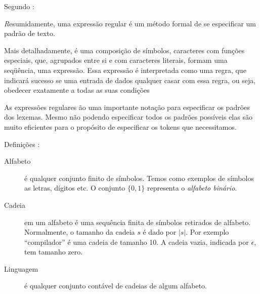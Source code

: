 Segundo :
\begin{citacao}{4cm}{0cm} \footnotesize \emph
	Resumidamente, uma expressão regular é um método formal de se especificar um padrão de texto.

	Mais detalhadamente, é uma composição de símbolos, caracteres com funções
	especiais, que, agrupados entre si e com caracteres literais, formam uma
	seqüência, uma expressão. Essa expressão é interpretada como uma regra, que
	indicará sucesso se uma entrada de dados qualquer casar com essa regra, ou
	seja, obedecer exatamente a todas as suas condições
\end{citacao}

As expressões regulares ão uma importante notação para especificar os padrões
dos lexemas. Mesmo não podendo especificar todos os padrões possíveis elas são
muito eficientes para o propósito de especificar os tokens que necessitamos.

Definições \cite{new-dragon-pt}:
\begin{description}
	\item[Alfabeto] é qualquer conjunto finito de símbolos. Temos como exemplos
		de símbolos as letras, dígitos etc. O conjunto $\{0, 1\}$ representa o
		\emph{alfabeto binário}.
	\item[Cadeia] em um alfabeto é uma sequência finita de símbolos retirados de
		alfabeto. Normalmente, o tamanho da cadeia $s$ é dado por $|s|$. Por
		exemplo ``compilador'' é uma cadeia de tamanho 10. A cadeia vazia,
		indicada por $\epsilon$, tem tamanho zero.
	\item[Linguagem] é qualquer conjunto contável de cadeias de algum alfabeto.
\end{description}

